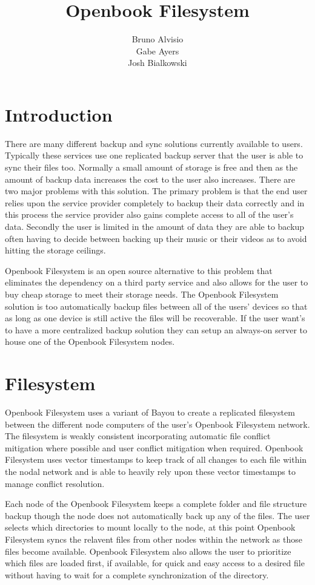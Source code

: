 \documentclass[letterpaper]{article}
\title{Openbook Filesystem}
\author{Bruno Alvisio\\Gabe Ayers\\Josh Bialkowski}
\begin{document}
\maketitle
\section{Introduction}
There are many different backup and sync solutions currently available to users. Typically these services use one replicated backup server that the user is able to sync their files too. Normally a small amount of storage is free and then as the amount of backup data increases the cost to the user also increases.  There are two major problems with this solution. The primary problem is that the end user relies upon the service provider completely to backup their data correctly and in this process the service provider also gains complete access to all of the user’s data. Secondly the user is limited in the amount of data they are able to backup often having to decide between backing up their music or their videos as to avoid hitting the storage ceilings.

Openbook Filesystem is an open source alternative to this problem that eliminates the dependency on a third party service and also allows for the user to buy cheap storage to meet their storage needs. The Openbook Filesystem solution is too automatically backup files between all of the users’ devices so that as long as one device is still active the files will be recoverable. If the user want’s to have a more centralized backup solution they can setup an always-on server to house one of the Openbook Filesystem nodes.

\section{Filesystem}
Openbook Filesystem uses a variant of Bayou to create a replicated filesystem between the different node computers of the user's Openbook Filesystem network. The filesystem is weakly consistent incorporating automatic file conflict mitigation where possible and user conflict mitigation when required. Openbook Filesystem uses vector timestamps to keep track of all changes to each file within the nodal network and is able to heavily rely upon these vector timestamps to manage conflict resolution.

Each node of the Openbook Filesystem keeps a complete folder and file structure backup though the node does not automatically back up any of the files. The user selects which directories to mount locally to the node, at this point Openbook Filesystem syncs the relavent files from other nodes within the network as those files become available. Openbook Filesystem also allows the user to prioritize which files are loaded first, if available, for quick and easy access to a desired file without having to wait for a complete synchronization of the directory.
\end{document}
